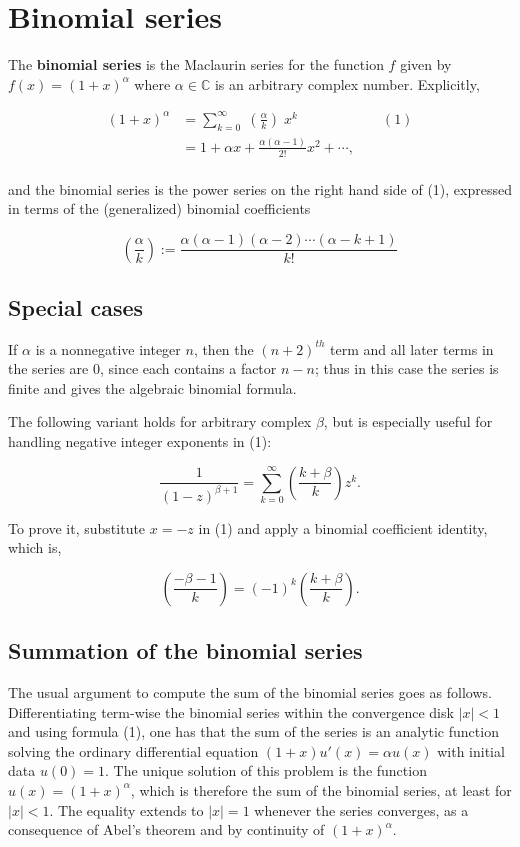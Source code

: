 \documentclass[11pt]{article}
\author{javier}
\date{\today}
\title{}
\begin{document}
\section{Binomial series}
\label{sec:orgfb57b45}

The \textbf{binomial series} is the Maclaurin series for the function
\(f\)
given by
\(f(x) = (1 + x)^{\alpha}\)
where
\(\alpha \in \mathbb{C}\)
is an arbitrary complex number. Explicitly,

$$\begin{matrix}
{(1 + x)^{\alpha}} & {= \sum\limits_{k = 0}^{\infty}\;{(\frac{\alpha}{k})}\; x^{k}\qquad\qquad\qquad(1)} \\
 & {= 1 + \alpha x + \frac{\alpha(\alpha - 1)}{2!}x^{2} + \cdots,} \\
\end{matrix}$$

and the binomial series is the power series on
the right hand side of (1), expressed in terms of the
(generalized) binomial coefficients

$${(\frac{\alpha}{k})}:=\frac{\alpha(\alpha - 1)(\alpha - 2)\cdots(\alpha - k + 1)}{k!}$$

\subsection{Special cases}
\label{sec:orgecbf178}

If \(\alpha\) is a nonnegative integer \(n\), then the \((n + 2)^{th}\) term and all
later terms in the series are 0, since each contains a factor
\(n-n\); thus in this case the series is finite and gives the
algebraic binomial formula.

The following variant holds for arbitrary complex \(\beta\), but is especially
useful for handling negative integer exponents in (1):

$$\frac{1}{(1 - z)^{\beta + 1}} = \sum\limits_{k = 0}^{\infty}{(\frac{k + \beta}{k})}z^{k}.$$

To prove it, substitute \(x=-z\) in (1) and apply a binomial
coefficient identity, which is,

$${(\frac{- \beta - 1}{k})} = ( - 1)^{k}{(\frac{k + \beta}{k})}.$$

\subsection{Summation of the binomial series}
\label{sec:org83a9472}

The usual argument to compute the sum of the binomial series goes as
follows. Differentiating term-wise the binomial series within the
convergence disk \(|x| < 1\) and using formula (1), one has that the sum
of the series is an analytic function
solving the ordinary differential equation \((1+x)u'(x) = \alpha u(x)\)
with initial data \(u(0) = 1\). The unique solution of this
problem is the function \(u(x) = (1+x)^{\alpha}\), which is therefore
the sum of the binomial series, at least for \(|x|<1\). The equality
extends to \(|x|=1\) whenever the series converges, as a consequence of
Abel's theorem and by continuity of \((1+x)^{\alpha}\).
\end{document}
